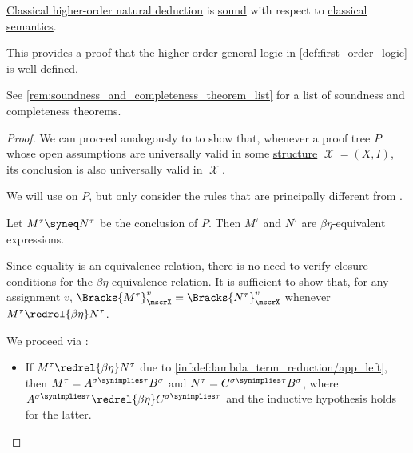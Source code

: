 \begin{theorem}\label{thm:hol_natural_deduction_soundness}
  \hyperref[def:hol_natural_deduction]{Classical higher-order natural deduction} is \hyperref[def:general_logic]{sound} with respect to \hyperref[def:truth_value_algebra/classical]{classical} \hyperref[def:hol_semantics]{semantics}.
\end{theorem}
\begin{comments}
  \item This provides a proof that the higher-order general logic in \cref{def:first_order_logic} is well-defined.
  \item See \cref{rem:soundness_and_completeness_theorem_list} for a list of soundness and completeness theorems.
\end{comments}
\begin{proof}
  We can proceed analogously to  to show that, whenever a proof tree \( P \) whose open assumptions are universally valid in some \hyperref[def:hol_structure]{structure} \( \mscrX = (X, I) \), its conclusion is also universally valid in \( \mscrX \).

  We will use  on \( P \), but only consider the rules that are principally different from .

   Let \( M^\tau \syneq N^\tau \) be the conclusion of \( P \). Then \( M^\tau \) and \( N^\tau \) are \( \beta\eta \)-equivalent expressions.

  Since equality is an equivalence relation, there is no need to verify closure conditions for the \( \beta\eta \)-equivalence relation. It is sufficient to show that, for any assignment \( v \), \( \Bracks{M^\tau}_\mscrX^v = \Bracks{N^\tau}_\mscrX^v \) whenever \( M^\tau \redrel{\beta\eta} N^\tau \).

  We proceed via :
  \begin{itemize}
    \item If \( M^\tau \redrel{\beta\eta} N^\tau \) due to \ref{inf:def:lambda_term_reduction/app_left}, then \( M^\tau = A^{\sigma \synimplies \tau} B^\sigma \) and \( N^\tau = C^{\sigma \synimplies \tau} B^\sigma \), where \( A^{\sigma \synimplies \tau} \redrel{\beta\eta} C^{\sigma \synimplies \tau} \) and the inductive hypothesis holds for the latter.


\end{itemize}
\end{proof}
